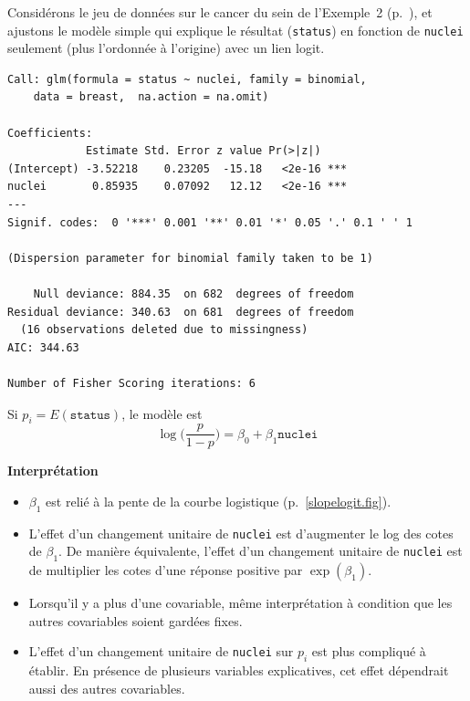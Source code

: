 \documentclass{BeamerTemplate}
\begin{document}
\begin{refsection}
\begin{frame}[fragile]{}

Considérons le jeu de données sur le cancer du sein de l'Exemple~2
(p.~\pageref{example2}), et ajustons le modèle simple qui explique le
résultat (\texttt{status}) en fonction
de \texttt{nuclei} seulement (plus l'ordonnée à l'origine) avec un lien logit.

\bigskip

{\scriptsize
\begin{verbatim}
Call: glm(formula = status ~ nuclei, family = binomial, 
    data = breast,  na.action = na.omit)

Coefficients:
            Estimate Std. Error z value Pr(>|z|)    
(Intercept) -3.52218    0.23205  -15.18   <2e-16 ***
nuclei       0.85935    0.07092   12.12   <2e-16 ***
---
Signif. codes:  0 '***' 0.001 '**' 0.01 '*' 0.05 '.' 0.1 ' ' 1

(Dispersion parameter for binomial family taken to be 1)

    Null deviance: 884.35  on 682  degrees of freedom
Residual deviance: 340.63  on 681  degrees of freedom
  (16 observations deleted due to missingness)
AIC: 344.63

Number of Fisher Scoring iterations: 6
\end{verbatim}
}
\end{frame}

\begin{frame}{}
Si $p_i = E(\texttt{status})$, le modèle est
$$\log\Big(\frac{p}{1-p}\Big) = \beta_0 + \beta_1 \texttt{nuclei}$$

\bigskip

\textbf{Interprétation}
\begin{itemize}
\item $\beta_1$ est relié à la pente de la courbe logistique (p.~\ref{slopelogit.fig}).
\item L'effet d'un changement unitaire de \texttt{nuclei} est d'augmenter le log des cotes de
$\beta_1$. De manière équivalente, l'effet d'un changement unitaire de  \texttt{nuclei} est de
multiplier les cotes d'une réponse positive par $\exp(\beta_1)$.
\item Lorsqu'il y a plus d'une
covariable, même interprétation à condition que les
autres covariables soient gardées fixes.
\item L'effet d'un changement unitaire de \texttt{nuclei} sur $p_i$ est plus
compliqué à établir. En présence de plusieurs variables explicatives, cet
effet dépendrait aussi des autres covariables.
\end{itemize}


\end{frame}
\end{refsection}
\end{document}
